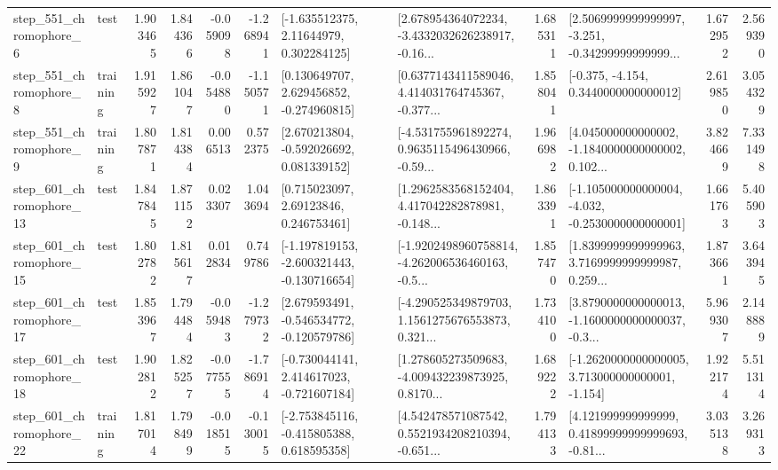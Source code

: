 \begin{tabular}{llrrrrllrlrr}
   step\_551\_chromophore\_6 &      test &      1.903465 &    1.844366 &     -0.059098 & -1.268941 &     [-1.635512375, 2.11644979, 0.302284125] &  [2.678954364072234, -3.4332032626238917, -0.16... &       1.685311 &  [2.5069999999999997, -3.251, -0.34299999999999... &            1.672952 &          2.569390 \\
   step\_551\_chromophore\_8 &  training &      1.915927 &    1.861047 &     -0.054880 & -1.150571 &    [0.130649707, 2.629456852, -0.274960815] &  [0.6377143411589046, 4.414031764745367, -0.377... &       1.858041 &               [-0.375, -4.154, 0.3440000000000012] &            2.619850 &          3.054329 \\
   step\_551\_chromophore\_9 &  training &      1.807871 &    1.814384 &      0.006513 &  0.572375 &    [2.670213804, -0.592026692, 0.081339152] &  [-4.531755961892274, 0.9635115496430966, -0.59... &       1.966982 &  [4.045000000000002, -1.1840000000000002, 0.102... &            3.824669 &          7.331498 \\
  step\_601\_chromophore\_13 &      test &      1.847845 &    1.871152 &      0.023307 &  1.043694 &      [0.715023097, 2.69123846, 0.246753461] &  [1.2962583568152404, 4.417042282878981, -0.148... &       1.863391 &  [-1.105000000000004, -4.032, -0.2530000000000001] &            1.661763 &          5.405903 \\
  step\_601\_chromophore\_15 &      test &      1.802782 &    1.815617 &      0.012834 &  0.749786 &  [-1.197819153, -2.600321443, -0.130716654] &  [-1.9202498960758814, -4.262006536460163, -0.5... &       1.857470 &  [1.8399999999999963, 3.7169999999999987, 0.259... &            1.873661 &          3.643945 \\
  step\_601\_chromophore\_17 &      test &      1.853967 &    1.794484 &     -0.059483 & -1.279732 &   [2.679593491, -0.546534772, -0.120579786] &  [-4.290525349879703, 1.1561275676553873, 0.321... &       1.734100 &  [3.8790000000000013, -1.1600000000000037, -0.3... &            5.969307 &          2.148889 \\
  step\_601\_chromophore\_18 &      test &      1.902812 &    1.825257 &     -0.077555 & -1.786914 &   [-0.730044141, 2.414617023, -0.721607184] &  [1.278605273509683, -4.009432239873925, 0.8170... &       1.689222 &   [-1.2620000000000005, 3.713000000000001, -1.154] &            1.922174 &          5.511314 \\
  step\_601\_chromophore\_22 &  training &      1.817014 &    1.798499 &     -0.018515 & -0.130015 &   [-2.753845116, -0.415805388, 0.618595358] &  [4.542478571087542, 0.5521934208210394, -0.651... &       1.794133 &  [4.121999999999999, 0.41899999999999693, -0.81... &            3.035138 &          3.269313 \\

\end{tabular}
